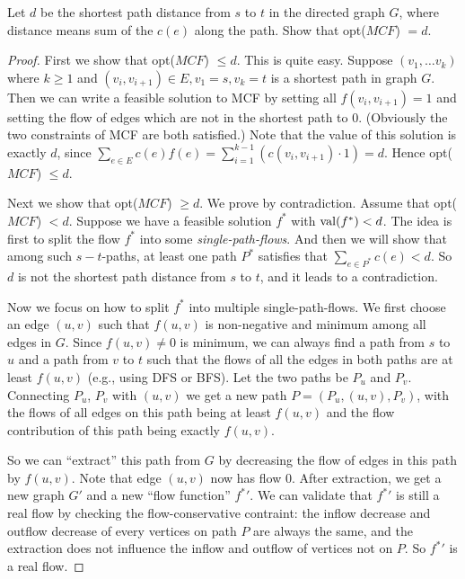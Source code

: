 



    \begin{thm}{}{}
        Let $d$ be the shortest path distance from $s$ to $t$ in the directed graph $G$, where distance means sum of the $c(e)$ along the path. Show that opt($MCF$) $= d$.
    \end{thm}

    \begin{proof}
        First we show that opt($MCF$) $\leqslant d$. This is quite easy. Suppose $(v_1, \ldots v_k)$ where $k \geqslant 1$ and $(v_i, v_{i + 1}) \in E, v_1 = s, v_k = t$ is a shortest path in graph $G$. Then we can write a feasible solution to MCF by setting all $f(v_i, v_{i + 1}) = 1$ and setting the flow of edges which are not in the shortest path to $0$. (Obviously the two constraints of MCF are both satisfied.) Note that the value of this solution is exactly $d$, since $\sum_{e \in E} c(e) f(e) = \sum_{i = 1}^{k - 1} (c(v_i, v_{i + 1}) \cdot 1) = d$. Hence opt($MCF$) $\leqslant d$.
        
        Next we show that opt($MCF$) $\geqslant d$. We prove by contradiction. Assume that opt($MCF$) $< d$. Suppose we have a feasible solution $f^*$ with ${\rm val}(f^*) < d$. The idea is first to split the flow $f^*$ into some {\it single-path-flows}. And then we will show that among such $s-t$-paths, at least one path $P^*$ satisfies that $\sum_{e \in P^*} c(e) < d$. So $d$ is not the shortest path distance from $s$ to $t$, and it leads to a contradiction.
        
        \bigskip
        
        Now we focus on how to split $f^*$ into multiple single-path-flows. We first choose an edge $(u, v)$ such that $f(u, v)$ is non-negative and minimum among all edges in $G$. Since $f(u, v) \neq 0$ is minimum, we can always find a path from $s$ to $u$ and a path from $v$ to $t$ such that the flows of all the edges in both paths are at least $f(u, v)$ (e.g., using DFS or BFS). Let the two paths be $P_u$ and $P_v$. Connecting $P_u$, $P_v$ with $(u, v)$ we get a new path $P = \left(P_u, (u, v), P_v\right)$, with the flows of all edges on this path being at least $f(u, v)$ and the flow contribution of this path being exactly $f(u, v)$.
        
        So we can ``extract'' this path from $G$ by decreasing the flow of edges in this path by $f(u, v)$. Note that edge $(u, v)$ now has flow $0$. After extraction, we get a new graph $G'$ and a new ``flow function'' ${f^*}'$. We can validate that ${f^*}'$ is still a real flow by checking the flow-conservative contraint: the inflow decrease and outflow decrease of every vertices on path $P$ are always the same, and the extraction does not influence the inflow and outflow of vertices not on $P$. So ${f^*}'$ is a real flow.
        

\end{proof}
